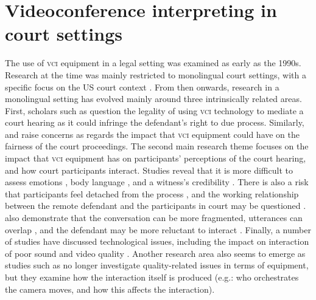 \documentclass[output=paper]{langsci/langscibook}
\begin{document}
\section{Videoconference interpreting in court settings}
\label{sec:devaux:2}
The use of \textsc{vci} equipment in a legal setting was examined as early as the 1990s. Research at the time was mainly restricted to monolingual court settings, with a specific focus on the US court context \citep{Radburn-Remfry1994,Thaxton1993}. From then onwards, research in a monolingual setting has evolved mainly around three intrinsically related areas. First, scholars such as \citet{Johnson2006} question the legality of using \textsc{vci} technology to mediate a court hearing as it could infringe the defendant’s right to due process. Similarly, \citet{Radburn-Remfry1994} and \citet{Thaxton1993} raise concerns as regards the impact that \textsc{vci} equipment could have on the fairness of the court proceedings. The second main research theme focuses on the impact that \textsc{vci} equipment has on participants’ perceptions of the court hearing, and how court participants interact. Studies reveal that it is more difficult to assess emotions \citep{Radburn-Remfry1994}, body language \citep{Fullwood2008}, and a witness’s credibility \citep{Roth2000}. There is also a risk that participants feel detached from the process \citep{McKay2016}, and the working relationship between the remote defendant and the participants in court may be questioned \citep{Hodges2008}. \citet{Verdier2011} also demonstrate that the conversation can be more fragmented, utterances can overlap \citep{Licoppe2015}, and the defendant may be more reluctant to interact \citep{Licoppe2014}. Finally, a number of studies have discussed technological issues, including the impact on interaction of poor sound and video quality \citep{Haas2006, Plotnikoff2000}. Another research area also seems to emerge as studies such as \citet{Licoppe2013} no longer investigate quality-related issues in terms of equipment, but they examine how the interaction itself is produced (e.g.: who orchestrates the camera moves, and how this affects the interaction). 
\end{document}
